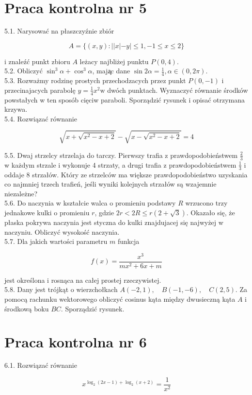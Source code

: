 \documentclass[10pt]{article}
\begin{document}
\section*{Praca kontrolna nr 5}
5.1. Narysować na płaszczyźnie zbiór

$$
A=\{(x, y):||x|-y| \leq 1,-1 \leq x \leq 2\}
$$

i znaleźć punkt zbioru $A$ leżacy najbliżej punktu $P(0,4)$.\\
5.2. Obliczyć $\sin ^{3} \alpha+\cos ^{3} \alpha$, maja̧c dane $\sin 2 \alpha=\frac{1}{4}, \alpha \in(0,2 \pi)$.\\
5.3. Rozważmy rodzinę prostych przechodzacych przez punkt $P(0,-1)$ i przecinajacych parabolę $y=\frac{1}{4} x^{2} \mathrm{w}$ dwóch punktach. Wyznaczyć równanie środków powstałych w ten sposób cięciw paraboli. Sporządzić rysunek i opisać otrzymana krzywa.\\
5.4. Rozwiązać równanie

$$
\sqrt{x+\sqrt{x^{2}-x+2}}-\sqrt{x-\sqrt{x^{2}-x+2}}=4
$$

5.5. Dwaj strzelcy strzelaja do tarczy. Pierwszy trafia z prawdopodobieństwem $\frac{2}{3}$ w każdym strzale i wykonuje 4 strzaty, a drugi trafia z prawdopodobieństwem $\frac{1}{3}$ i oddaje 8 strzałów. Który ze strzelców ma większe prawdopodobieństwo uzyskania co najmniej trzech trafień, jeśli wyniki kolejnych strzałów są wzajemnie niezależne?\\
5.6. Do naczynia w kształcie walca o promieniu podstawy $R$ wrzucono trzy jednakowe kulki o promieniu $r$, gdzie $2 r<2 R \leq r(2+\sqrt{3})$. Okazało się, że płaska pokrywa naczynia jest styczna do kulki znajdujacej się najwyżej w naczyniu. Obliczyć wysokość naczynia.\\
5.7. Dla jakich wartości parametru $m$ funkcja

$$
f(x)=\frac{x^{3}}{m x^{2}+6 x+m}
$$

jest określona i rosnąca na całej prostej rzeczywistej.\\
5.8. Dany jest trójkąt o wierzchołkach $A(-2,1), \quad B(-1,-6), \quad C(2,5)$. Za pomocą rachunku wektorowego obliczyć cosinus kąta między dwusieczną kąta $A$ i środkową boku $B C$. Sporządzić rysunek.

\section*{Praca kontrolna nr 6}
6.1. Rozwiązać równanie

$$
x^{\log _{2}(2 x-1)+\log _{2}(x+2)}=\frac{1}{x^{2}}
$$
\end{document}
